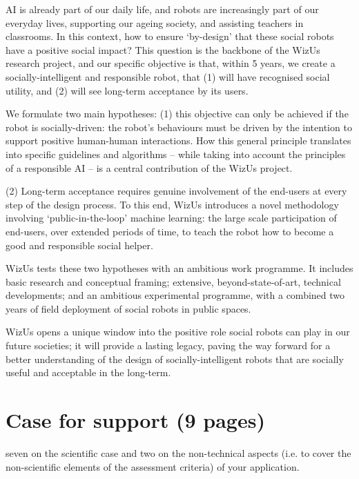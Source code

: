 \documentclass[11pt,a4paper]{report}
\newcommand{\project}{WizUs\xspace}
\begin{document}
AI is already part of our daily life, and robots are increasingly part of our
everyday lives, supporting our ageing society, and assisting teachers in
classrooms. In this context, how to ensure `by-design' that these social robots
have a positive social impact? This question is the backbone of the \project
research project, and our specific objective is that, within 5 years, we create
a socially-intelligent and responsible robot, that (1) will have recognised
social utility, and (2) will see long-term acceptance by its users.

We formulate two main hypotheses: (1) this objective can only be achieved if the
robot is socially-driven: the robot's behaviours must be driven by the intention
to support positive human-human interactions. How this general principle
translates into specific guidelines and algorithms -- while taking into account
the principles of a responsible AI -- is a central contribution of the \project
project.

(2) Long-term acceptance requires genuine involvement of the end-users at every
step of the design process. To this end, \project introduces a novel methodology
involving `public-in-the-loop' machine learning: the large scale participation
of end-users, over extended periods of time, to teach the robot how to become a
good and responsible social helper.

\project tests these two hypotheses with an ambitious work programme. It includes
basic research and conceptual framing; extensive, beyond-state-of-art, technical
developments; and an ambitious experimental programme, with a combined two
years of field deployment of social robots in public spaces.

\project opens a unique window into the positive role social robots can play in our
future societies; it will provide a lasting legacy, paving the way forward for a
better understanding of the design of socially-intelligent robots that are
socially useful and acceptable in the long-term.




\newpage


\pagebreak

\chapter{Case for support (9 pages)}

seven on the scientific case and two on the non-technical
aspects (i.e. to cover the non-scientific elements of the assessment criteria) of your
application.
\end{document}
